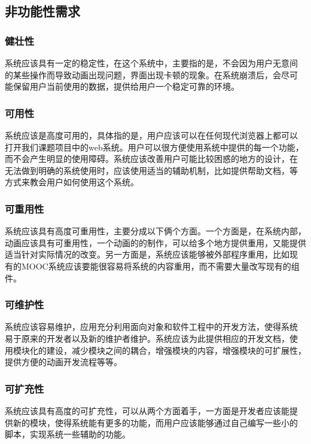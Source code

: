 \subsection{非功能性需求}
\subsubsection{健壮性}
系统应该具有一定的稳定性，在这个系统中，主要指的是，不会因为用户无意间
的某些操作而导致动画出现问题，界面出现卡顿的现象。在系统崩溃后，会尽可
能保留用户当前使用的数据，提供给用户一个稳定可靠的环境。
\subsubsection{可用性}
系统应该是高度可用的，具体指的是，用户应该可以在任何现代浏览器上都可以
打开我们课题项目中的web系统。用户可以很方便使用系统中提供的每一个功能，
而不会产生明显的使用障碍。系统应该改善用户可能比较困惑的地方的设计，在
无法做到明确的系统使用时，应该使用适当的辅助机制，比如提供帮助文档，等
方式来教会用户如何使用这个系统。
\subsubsection{可重用性}
系统应该具有高度可重用性，主要分成以下俩个方面。一个方面是，在系统内部，
动画应该具有可重用性，一个动画的的制作，可以给多个地方提供重用，又能提供
适当针对实际情况的改变。另一方面是，系统应该能够被外部程序重用，比如现
有的MOOC系统应该要能很容易将系统的内容重用，而不需要大量改写现有的组件。
\subsubsection{可维护性}
系统应该容易维护，应用充分利用面向对象和软件工程中的开发方法，使得系统
易于原来的开发者以及新的维护者维护。系统应该为此提供相应的开发文档，使
用模块化的建设，减少模块之间的耦合，增强模块的内容，增强模块的可扩展性，
提供方便的动画开发流程等等。
\subsubsection{可扩充性}
系统应该具有高度的可扩充性，可以从两个方面着手，一方面是开发者应该能提
供新的模块，使得系统能有更多的功能，而用户应该能够通过自己编写一些小的
脚本，实现系统一些辅助的功能。